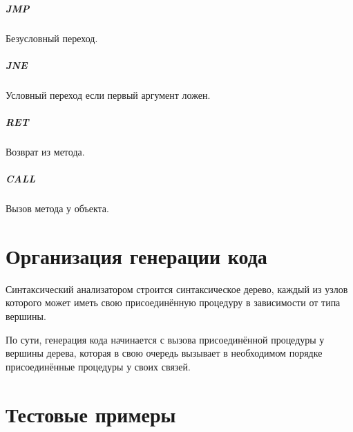 \documentclass[a4paper,12pt,notitlepage,pdftex]{scrreprt}
\begin{document}
    \paragraph{JMP} Безусловный переход.
    \paragraph{JNE} Условный переход если первый аргумент ложен.
    \paragraph{RET} Возврат из метода.
    \paragraph{CALL} Вызов метода у объекта.
\chapter{Организация генерации кода}
    Синтаксический анализатором строится синтаксическое дерево, каждый из узлов которого может иметь свою
    присоединённую процедуру в зависимости от типа вершины.

    По сути, генерация кода начинается с вызова присоединённой процедуры у вершины дерева, которая в свою очередь
    вызывает в необходимом порядке присоединённые процедуры у своих связей.
\chapter{Тестовые примеры}
\label{chap:fourth}
        
\end{document}
